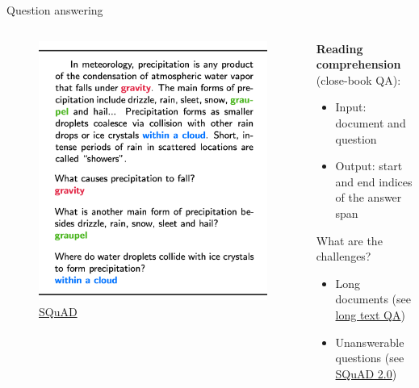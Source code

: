 \documentclass[usenames,dvipsnames,notes,11pt,aspectratio=169,hyperref={colorlinks=true, linkcolor=blue}]{beamer}
\begin{document}
\begin{frame}
    {Question answering}

    \begin{columns}
        \begin{column}{0.5\textwidth}
            \begin{figure}
                \includegraphics[height=0.7\textheight]{figures/squad}
                \caption{\href{https://arxiv.org/pdf/1606.05250.pdf}{SQuAD}}
            \end{figure}
        \end{column}
        \begin{column}{0.5\textwidth}
            \textbf{Reading comprehension} (close-book QA):\\
            \begin{itemize}
                \item[] Input: document and question
                \item[] Output: start and end indices of the answer span
            \end{itemize}

            \bigskip
            What are the challenges?\\
            \begin{itemize}
                \item Long documents (see \href{https://arxiv.org/abs/2112.08608}{long text QA})
                \item Unanswerable questions (see \href{https://arxiv.org/abs/1806.03822}{SQuAD 2.0})
            \end{itemize}
        \end{column}
    \end{columns}
\end{frame}
\end{document}
